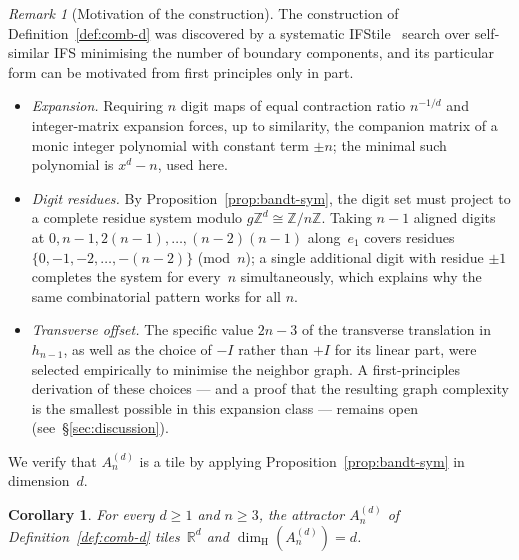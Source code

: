 \documentclass{amsart}
\newtheorem{corollary}[theorem]{Corollary}
\theoremstyle{definition}
\theoremstyle{remark}
\newtheorem{remark}[theorem]{Remark}
\newcommand{\R}{\mathbb{R}}
\newcommand{\Z}{\mathbb{Z}}
\newcommand{\dH}{\dim_{\mathrm{H}}}
\begin{document}
\begin{remark}[Motivation of the construction]
The construction of Definition~\ref{def:comb-d} was discovered by
a systematic IFStile~\cite{ifstile} search over self-similar IFS
minimising the number of boundary components, and its particular
form can be motivated from first principles only in part.
\begin{itemize}
\item \emph{Expansion.} Requiring $n$ digit maps of equal
  contraction ratio $n^{-1/d}$ and integer-matrix expansion
  forces, up to similarity, the companion matrix of a monic
  integer polynomial with constant term $\pm n$; the minimal
  such polynomial is $x^d - n$, used here.
\item \emph{Digit residues.} By Proposition~\ref{prop:bandt-sym},
  the digit set must project to a complete residue system modulo
  $g\Z^d \cong \Z/n\Z$.  Taking $n{-}1$ aligned digits at
  $0, n{-}1, 2(n{-}1), \ldots, (n{-}2)(n{-}1)$ along~$e_1$
  covers residues $\{0, -1, -2, \ldots, -(n{-}2)\}$
  (mod~$n$); a single additional digit with residue $\pm 1$
  completes the system for every~$n$ simultaneously, which
  explains why the same combinatorial pattern works for all $n$.
\item \emph{Transverse offset.} The specific value $2n{-}3$ of
  the transverse translation in $h_{n-1}$, as well as the choice
  of $-I$ rather than $+I$ for its linear part, were selected
  empirically to minimise the neighbor graph.  A first-principles
  derivation of these choices --- and a proof that the resulting
  graph complexity is the smallest possible in this
  expansion class --- remains open
  (see~\S\ref{sec:discussion}).
\end{itemize}
\end{remark}

We verify that $A_n^{(d)}$ is a tile by applying
Proposition~\ref{prop:bandt-sym} in dimension~$d$.

\begin{corollary}\label{cor:comb-tile}
For every $d \ge 1$ and $n \ge 3$, the attractor $A_n^{(d)}$
of Definition~\textup{\ref{def:comb-d}}
tiles~$\R^d$ and $\dH(A_n^{(d)}) = d$.
\end{corollary}
\end{document}
